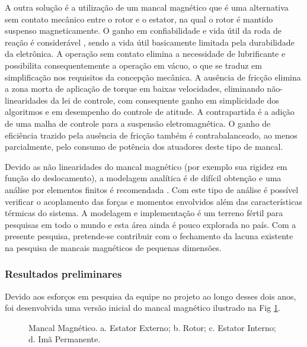 A outra solução é a utilização de um mancal magnético \cite{marble2006bearing, bangcheng2012integral} que é uma alternativa sem contato mecânico entre o rotor e o estator, na qual o rotor é mantido suspenso magneticamente. O ganho em confiabilidade e vida útil da roda de reação é considerável \cite{ladner1964earth}, sendo a vida útil basicamente limitada  pela durabilidade da eletrônica. A operação sem contato elimina a necessidade de lubrificante e possibilita consequentemente a operação em vácuo, o que se traduz em simplificação nos requisitos da concepção mecânica. A ausência de fricção elimina a zona morta de aplicação de torque em baixas velocidades, eliminando não-linearidades da lei de controle, com consequente ganho em simplicidade dos algoritmos e em desempenho do controle de atitude. A contrapartida é a adição de uma malha de controle para a suspensão eletromagnética. O ganho de eficiência trazido pela ausência de fricção também é contrabalanceado, ao menos parcialmente, pelo consumo de potência dos atuadores deste tipo de mancal.
	
Devido as não linearidades do mancal magnético (por exemplo sua rigidez em função do deslocamento), a modelagem analítica é de difícil obtenção e uma análise por elementos finitos é recomendada \cite{pilat2007automatic}. Com este tipo de análise é possível verificar o acoplamento das forças e momentos envolvidos além das características térmicas do sistema. A modelagem e implementação é um terreno fértil para pesquisas em todo o mundo e  esta área ainda é pouco explorada no país. Com a presente pesquisa, pretende-se contribuir com o fechamento da lacuna existente na pesquisa de mancais magnéticos de pequenas dimensões.

\subsubsection{Resultados preliminares}

	Devido aos esforços em pesquisa da equipe no projeto ao longo desses dois anos, foi desenvolvida uma versão inicial do mancal magnético ilustrado na Fig \ref{fig:mancal}. 
	
	\begin{figure}[!h]  
		\centering
		\caption{Mancal Magnético. a. Estator Externo; b. Rotor; c. Estator Interno; d. Imã Permanente.}
		\label{fig:mancal}
	\end{figure}
	
